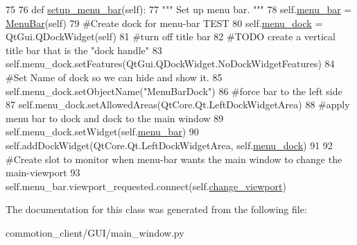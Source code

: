 \begin{DoxyCode}
75 
76     \textcolor{keyword}{def }\hyperlink{classcommotion__client_1_1GUI_1_1main__window_1_1MainWindow_abacf45b62be7d880089c913e3f2f7f24}{setup\_menu\_bar}(self):
77         \textcolor{stringliteral}{""" Set up menu bar. """}
78         self.\hyperlink{classcommotion__client_1_1GUI_1_1main__window_1_1MainWindow_aeb2999af8c5674cefb026fdb70e72cea}{menu\_bar} = \hyperlink{classcommotion__client_1_1GUI_1_1menu__bar_1_1MenuBar}{MenuBar}(self)
79         \textcolor{comment}{#Create dock for menu-bar TEST}
80         self.\hyperlink{classcommotion__client_1_1GUI_1_1main__window_1_1MainWindow_a94ece117d428ecf011a8a8a8d2bf6d14}{menu\_dock} = QtGui.QDockWidget(self)
81         \textcolor{comment}{#turn off title bar}
82         \textcolor{comment}{#TODO create a vertical title bar that is the "dock handle"}
83         self.menu\_dock.setFeatures(QtGui.QDockWidget.NoDockWidgetFeatures)
84         \textcolor{comment}{#Set Name of dock so we can hide and show it.}
85         self.menu\_dock.setObjectName(\textcolor{stringliteral}{"MenuBarDock"})
86         \textcolor{comment}{#force bar to the left side}
87         self.menu\_dock.setAllowedAreas(QtCore.Qt.LeftDockWidgetArea)
88         \textcolor{comment}{#apply menu bar to dock and dock to the main window}
89         self.menu\_dock.setWidget(self.\hyperlink{classcommotion__client_1_1GUI_1_1main__window_1_1MainWindow_aeb2999af8c5674cefb026fdb70e72cea}{menu\_bar})
90         self.addDockWidget(QtCore.Qt.LeftDockWidgetArea, self.\hyperlink{classcommotion__client_1_1GUI_1_1main__window_1_1MainWindow_a94ece117d428ecf011a8a8a8d2bf6d14}{menu\_dock})
91 
92         \textcolor{comment}{#Create slot to monitor when menu-bar wants the main window to change the main-viewport}
93         self.menu\_bar.viewport\_requested.connect(self.\hyperlink{classcommotion__client_1_1GUI_1_1main__window_1_1MainWindow_a0e9201cd1165369bdac93cf1b4658c6f}{change\_viewport})

\end{DoxyCode}


The documentation for this class was generated from the following file\+:\begin{DoxyCompactItemize}
\item 
commotion\+\_\+client/\+G\+U\+I/main\+\_\+window.\+py\end{DoxyCompactItemize}
